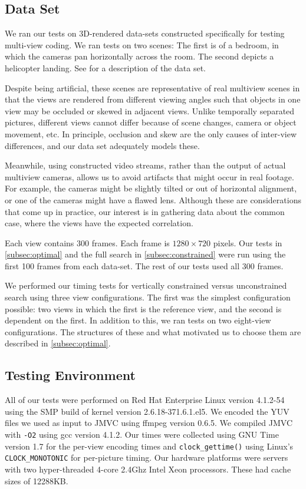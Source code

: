 \documentclass{sig-alternate-05-2015}
\begin{document}
\subsection{Data Set}
\label{subsec:data-set}
We ran our tests on 3D-rendered data-sets constructed specifically for testing
multi-view coding. We ran tests on two scenes: The first is of a bedroom, in
which the cameras pan horizontally across the room. The second depicts a
helicopter landing. See \cite{zhang:multi} for a description of the data set.

Despite being artificial, these scenes are representative of real multiview
scenes in that the views are rendered from different viewing angles such that
objects in one view may be occluded or skewed in adjacent views. Unlike
temporally separated pictures, different views cannot differ because of scene
changes, camera or object movement, etc. In principle, occlusion and skew are
the only causes of inter-view differences, and our data set adequately models
these.

Meanwhile, using constructed video streams, rather than the output of actual
multiview cameras, allows us to avoid artifacts that might occur in real
footage. For example, the cameras might be slightly tilted or out of horizontal
alignment, or one of the cameras might have a flawed lens. Although these are
considerations that come up in practice, our interest is in gathering data about
the common case, where the views have the expected correlation.

Each view contains 300 frames. Each frame is $1280\times 720$ pixels. Our tests
in \ref{subsec:optimal} and the full search in \ref{subsec:constrained} were run
using the first 100 frames from each data-set. The rest of our tests used all
300 frames.

We performed our timing tests for vertically constrained versus unconstrained
search using three view configurations. The first was the simplest configuration
possible: two views in which the first is the reference view, and the second
is dependent on the first. In addition to this, we ran tests on two eight-view
configurations. The structures of these and what motivated us to choose them
are described in \ref{subsec:optimal}.

\subsection{Testing Environment}
\label{subsec:environment}
All of our tests were performed on Red Hat Enterprise Linux version 4.1.2-54
using the SMP build of kernel version 2.6.18-371.6.1.el5. We encoded the YUV
files we used as input to JMVC using ffmpeg version 0.6.5. We compiled JMVC
with {\tt -O2} using gcc version 4.1.2. Our times were collected using GNU Time
version 1.7 for the per-view encoding times and {\tt clock\_gettime()} using
Linux's {\tt CLOCK\_MONOTONIC} for per-picture timing. Our hardware platforms
were servers with two hyper-threaded 4-core 2.4Ghz Intel Xeon processors. These
had cache sizes of 12288KB.
\end{document}
